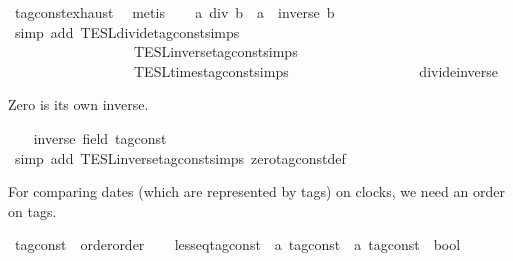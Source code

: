\begin{isabellebody}
\ tag{\isacharunderscore}const{\isachardot}exhaust\ \isamarkupfalse%
\ metis\isanewline
\ \ \isamarkupfalse%
\ {\isacartoucheopen}a\ div\ b\ {\isacharequal}\ a\ {\isacharasterisk}\ inverse\ b{\isacartoucheclose}\isanewline
\ \ \ \ \isamarkupfalse%
\ {\isacharparenleft}simp\ add{\isacharcolon}\ TESL{\isachardot}divide{\isacharunderscore}tag{\isacharunderscore}const{\isachardot}simps\isanewline
\ \ \ \ \ \ \ \ \ \ \ \ \ \ \ \ \ \ TESL{\isachardot}inverse{\isacharunderscore}tag{\isacharunderscore}const{\isachardot}simps\isanewline
\ \ \ \ \ \ \ \ \ \ \ \ \ \ \ \ \ \ TESL{\isachardot}times{\isacharunderscore}tag{\isacharunderscore}const{\isachardot}simps\isanewline
\ \ \ \ \ \ \ \ \ \ \ \ \ \ \ \ \ \ divide{\isacharunderscore}inverse{\isacharparenright}\isanewline
{}\isamarkupfalse%
%
\begin{isamarkuptext}%
Zero is its own inverse.%
\end{isamarkuptext}\isamarkuptrue%
\ \ \isamarkupfalse%
\ {\isacartoucheopen}inverse\ {\isacharparenleft}{}{\isacharcolon}{\isacharcolon}{\isacharparenleft}{\isacharprime}{\isasymtau}{\isacharcolon}{\isacharcolon}field\ tag{\isacharunderscore}const{\isacharparenright}{\isacharparenright}\ {\isacharequal}\ {}{\isacartoucheclose}\isanewline
\ \ \ \ \isamarkupfalse%
\ {\isacharparenleft}simp\ add{\isacharcolon}\ TESL{\isachardot}inverse{\isacharunderscore}tag{\isacharunderscore}const{\isachardot}simps\ zero{\isacharunderscore}tag{\isacharunderscore}const{\isacharunderscore}def{\isacharparenright}\isanewline
{}\isamarkupfalse%
%
\endisatagproof
{\isafoldproof}%
%
\isadelimproof
%
\endisadelimproof
\isanewline
\isanewline
{}\isamarkupfalse%
%
\begin{isamarkuptext}%
For comparing dates (which are represented by tags) on clocks, we need an order on tags.%
\end{isamarkuptext}\isamarkuptrue%
\isamarkupfalse%
\ tag{\isacharunderscore}const\ {\isacharcolon}{\isacharcolon}\ {\isacharparenleft}order{\isacharparenright}order\isanewline
{}\isanewline
\ \ \isamarkupfalse%
\ less{\isacharunderscore}eq{\isacharunderscore}tag{\isacharunderscore}const\ {\isacharcolon}{\isacharcolon}\ {\isacartoucheopen}{\isacharprime}a\ tag{\isacharunderscore}const\ {\isasymRightarrow}\ {\isacharprime}a\ tag{\isacharunderscore}const\ {\isasymRightarrow}\ bool{\isacartoucheclose}\isanewline
\ \ \isanewline

\end{isabellebody}
